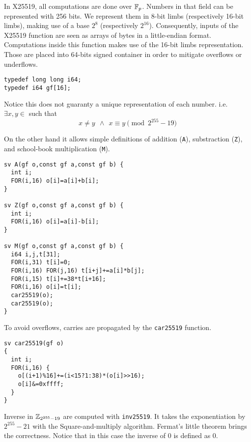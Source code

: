  In X25519, all computations are done over $\mathbb{F}_{p}$.
Numbers in that field can be represented with 256 bits.
We represent them in 8-bit limbs (respectively 16-bit limbs),
making use of a base $2^8$ (respectively $2^{16}$).
Consequently, inputs of the X25519 function are seen as arrays of bytes
in a little-endian format.
Computations inside this function makes use of the 16-bit limbs representation.
Those are placed into 64-bits signed container in order to mitigate overflows or underflows.
\begin{lstlisting}[language=Ctweetnacl]
typedef long long i64;
typedef i64 gf[16];
\end{lstlisting}
Notice this does not guaranty a unique representation of each number. i.e.\\
$\exists x,y \in$  such that
\vspace{-0.25cm}
$$x \neq y\ \ \land\ \ x \equiv y \pmod{2^{255}-19}$$

On the other hand it allows simple definitions of addition (\texttt{A}),
substraction (\texttt{Z}), and school-book multiplication (\texttt{M}).
\begin{lstlisting}[language=Ctweetnacl]
sv A(gf o,const gf a,const gf b) {
  int i;
  FOR(i,16) o[i]=a[i]+b[i];
}

sv Z(gf o,const gf a,const gf b) {
  int i;
  FOR(i,16) o[i]=a[i]-b[i];
}

sv M(gf o,const gf a,const gf b) {
  i64 i,j,t[31];
  FOR(i,31) t[i]=0;
  FOR(i,16) FOR(j,16) t[i+j]+=a[i]*b[j];
  FOR(i,15) t[i]+=38*t[i+16];
  FOR(i,16) o[i]=t[i];
  car25519(o);
  car25519(o);
}
\end{lstlisting}

To avoid overflows, carries are propagated by the \texttt{car25519} function.
\begin{lstlisting}[language=Ctweetnacl]
sv car25519(gf o)
{
  int i;
  FOR(i,16) {
    o[(i+1)%16]+=(i<15?1:38)*(o[i]>>16);
    o[i]&=0xffff;
  }
}
\end{lstlisting}

Inverse in $\mathbb{Z}_{2^{255}-19}$ are computed with \texttt{inv25519}.
It takes the exponentiation by $2^{255}-21$ with the Square-and-multiply algorithm.
Fermat's little theorem brings the correctness.
Notice that in this case the inverse of $0$ is defined as $0$.

